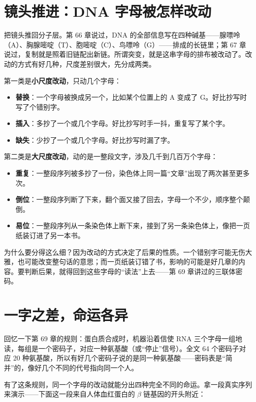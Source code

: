 \section{镜头推进：DNA 字母被怎样改动}

把镜头推回分子层。第 66 章说过，DNA 的全部信息写在四种碱基——腺嘌呤（A）、胸腺嘧啶（T）、胞嘧啶（C）、鸟嘌呤（G）——排成的长链里；第 67 章说过，复制就是照着旧链配出新链。所谓突变，就是这串字母的排布被改动了。改动的方式有好几种，尺度差别很大，先分成两类。

第一类是\textbf{小尺度改动}，只动几个字母：

\begin{itemize}[itemsep=2pt]
\item \textbf{替换}：一个字母被换成另一个，比如某个位置上的 A 变成了 G。好比抄写时写了个错别字。
\item \textbf{插入}：多抄了一个或几个字母。好比抄写时手一抖，重复写了某个字。
\item \textbf{缺失}：少抄了一个或几个字母。好比抄写时漏了字。
\end{itemize}

第二类是\textbf{大尺度改动}，动的是一整段文字，涉及几千到几百万个字母：

\begin{itemize}[itemsep=2pt]
\item \textbf{重复}：一整段序列被多抄了一份，染色体上同一篇“文章”出现了两次甚至更多次。
\item \textbf{倒位}：一整段序列断了下来，翻个面又接了回去，字母一个不少，顺序整个颠倒。
\item \textbf{易位}：一整段序列从一条染色体上断下来，接到了另一条染色体上，像把一页纸装订进了另一本书。
\end{itemize}

为什么要分得这么细？因为改动的方式决定了后果的性质。一个错别字可能无伤大雅，也可能改变整句话的意思；而一页纸装订错了书，影响的可能是好几章的内容。要判断后果，就得回到这些字母的“读法”上去——第 69 章讲过的三联体密码。

\section{一字之差，命运各异}

回忆一下第 69 章的规则：蛋白质合成时，机器沿着信使 RNA 三个字母一组地读，每组是一个密码子，对应一种氨基酸（或“停止”信号）。全文 64 个密码子对应 20 种氨基酸，所以有好几个密码子说的是同一种氨基酸——密码表是“简并”的，像好几个不同的代号指向同一个人。

有了这条规则，同一个字母的改动就能分出四种完全不同的命运。拿一段真实序列来演示——下面这一段来自人体血红蛋白的 \(\beta\) 链基因的开头附近：

